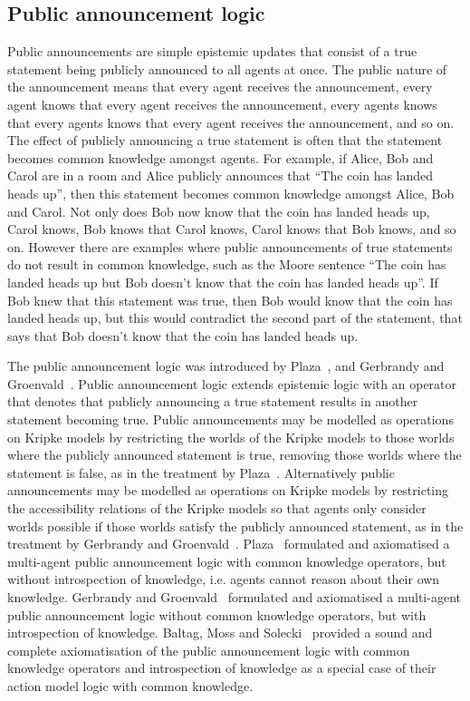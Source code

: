 \subsection{Public announcement logic}

Public announcements are simple epistemic updates that consist of a true statement being publicly announced to all agents at once.
The public nature of the announcement means that every agent receives the announcement, every agent knows that every agent receives the announcement, every agents knows that every agents knows that every agent receives the announcement, and so on. 
The effect of publicly announcing a true statement is often that the statement becomes common knowledge amongst agents. 
For example, if Alice, Bob and Carol are in a room and Alice publicly announces that ``The coin has landed heads up'', then this statement becomes common knowledge amongst Alice, Bob and Carol.
Not only does Bob now know that the coin has landed heads up, Carol knows, Bob knows that Carol knows, Carol knows that Bob knows, and so on.
However there are examples where public announcements of true statements do not result in common knowledge, such as the Moore sentence ``The coin has landed heads up but Bob doesn't know that the coin has landed heads up''.
If Bob knew that this statement was true, then Bob would know that the coin has landed heads up, but this would contradict the second part of the statement, that says that Bob doesn't know that the coin has landed heads up.

The public announcement logic was introduced by Plaza~\cite{plaza:1989}, and Gerbrandy and Groenvald~\cite{gerbrandy:1997}.
Public announcement logic extends epistemic logic with an operator that denotes that publicly announcing a true statement results in another statement becoming true.
Public announcements may be modelled as operations on Kripke models by restricting the worlds of the Kripke models to those worlds where the publicly announced statement is true, removing those worlds where the statement is false, as in the treatment by Plaza~\cite{plaza:1989}.
Alternatively public announcements may be modelled as operations on Kripke models by restricting the accessibility relations of the Kripke models so that agents only consider worlds possible if those worlds satisfy the publicly announced statement, as in the treatment by Gerbrandy and Groenvald~\cite{gerbrandy:1997}.
Plaza~\cite{plaza:1989} formulated and axiomatised a multi-agent public announcement logic with common knowledge operators, but without introspection of knowledge, i.e.  agents cannot reason about their own knowledge. 
Gerbrandy and Groenvald~\cite{gerbrandy:1997} formulated and axiomatised a multi-agent public announcement logic without common knowledge operators, but with introspection of knowledge.
Baltag, Moss and Solecki~\cite{baltag:1998,baltag:2004} provided a sound and complete axiomatisation of the public announcement logic with common knowledge operators and introspection of knowledge as a special case of their action model logic with common knowledge.

